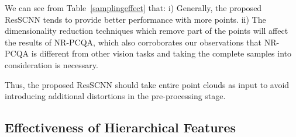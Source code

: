 \documentclass[acmsmall]{acmart}
\begin{document}
\begin{table}[htbp]
  \centering
  \caption{Performance of ResSCNN with different sampling versions.}
  \label{samplingeffect}\end{table}


\par We can see from Table~\ref{samplingeffect} that: i) Generally, the proposed ResSCNN tends to provide better performance with more points. ii) The dimensionality reduction techniques which remove part of the points will affect the results of NR-PCQA, which also corroborates our observations that NR-PCQA is different from other vision tasks and taking the complete samples into consideration is necessary.

\par Thus, the proposed ResSCNN should take entire point clouds as input to avoid introducing additional distortions in the pre-processing stage.

\subsection{Effectiveness of Hierarchical Features}
\end{document}
